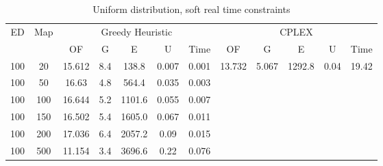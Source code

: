 \begin{table}[htb]
	\centering
	\begin{tabular}{|c|c|c|c|c|c|c|c|c|c|c|c|}
		\hline
		\multirow{2}{*}{ED} & \multirow{2}{*}{Map} & \multicolumn{5}{c|}{Greedy Heuristic} & \multicolumn{5}{c|}{CPLEX}\\ 
		\cline{3-12}
&& OF & G & E & U & Time & OF & G & E & U & Time\\ 
		\hline
		100 & 20 & 15.612 & 8.4 & 138.8 & 0.007 & 0.001 & 13.732 & 5.067 & 1292.8 & 0.04 & 19.42 \\ 
		100 & 50 & 16.63 & 4.8 & 564.4 & 0.035 & 0.003 & & & & &  \\ 
		100 & 100 & 16.644 & 5.2 & 1101.6 & 0.055 & 0.007 & & & & &  \\ 
		100 & 150 & 16.502 & 5.4 & 1605.0 & 0.067 & 0.011 & & & & &  \\ 
		100 & 200 & 17.036 & 6.4 & 2057.2 & 0.09 & 0.015 & & & & &  \\ 
		100 & 500 & 11.154 & 3.4 & 3696.6 & 0.22 & 0.076 & & & & &  \\ 
		\hline 
	\end{tabular} 
	\caption{Uniform distribution, soft real time constraints} 
	\label{tab:unif_soft} 
\end{table} 
